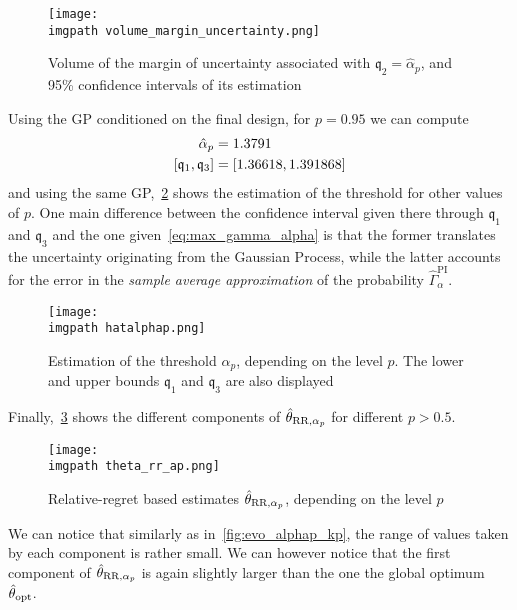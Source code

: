 \documentclass[../../Main_ManuscritThese.tex]{subfiles}
\newcommand\imgpath{/home/victor/acadwriting/Manuscrit/Text/Chapter5/img/}
\begin{document}
\begin{figure}[ht]
  \centering
  \texttt{[image: \\imgpath volume\_margin\_uncertainty.png]}
  \caption[Volume of the margin of uncertainty associated with
  $\mathfrak{q}_2 = \hat{\alpha}_p$]{\label{fig:vol_Meta} Volume of
    the margin of uncertainty associated with
    $\mathfrak{q}_2 = \hat{\alpha}_p$, and 95\% confidence intervals
    of its estimation}
\end{figure}


Using the GP conditioned on the final design, for $p=0.95$ we can compute
\begin{align}
  \hat{\alpha}_p &= \num{1.3791} \\
  \interval{\mathfrak{q}_1}{\mathfrak{q}_3} &= \interval{1.36618}{1.391868} \nonumber
\end{align}
and using the same GP,~\cref{fig:hat_alpha_p} shows the estimation of
the threshold for other values of $p$.  One main difference between
the confidence interval given there through $\mathfrak{q}_1$ and
$\mathfrak{q}_3$ and the one given~\cref{eq:max_gamma_alpha} is that
the former translates the uncertainty originating from the Gaussian
Process, while the latter accounts for the error in the \emph{sample
  average approximation} of the probability
$\hat{\Gamma}_{\alpha}^{\mathrm{PI}}$.
\begin{figure}[ht]
  \centering
  \texttt{[image: \\imgpath hatalphap.png]}
  \caption[Estimation of the threshold $\alpha_p$, depending on the
  level $p$]{\label{fig:hat_alpha_p} Estimation of the threshold
    $\alpha_p$, depending on the level $p$. The lower and upper bounds
    $\mathfrak{q}_1$ and $\mathfrak{q}_3$ are also displayed}
\end{figure}

Finally,~\cref{fig:theta_rr_alpha} shows the different components of
$\hat{\theta}_{\mathrm{RR},\alpha_p}$ for different $p> 0.5$.
\begin{figure}[ht]
  \centering
  \texttt{[image: \\imgpath theta\_rr\_ap.png]}
  \caption{\label{fig:theta_rr_alpha} Relative-regret based estimates
    $\hat{\theta}_{\mathrm{RR}, \alpha_p}$, depending on the level $p$}
\end{figure}
We can notice that similarly as in~\cref{fig:evo_alphap_kp}, the range
of values taken by each component is rather small. We can however
notice that the first component of $\hat{\theta}_{\mathrm{RR}, \alpha_p}$
is again slightly larger than the one the global optimum
$\hat{\theta}_{\mathrm{opt}}$.
\end{document}
